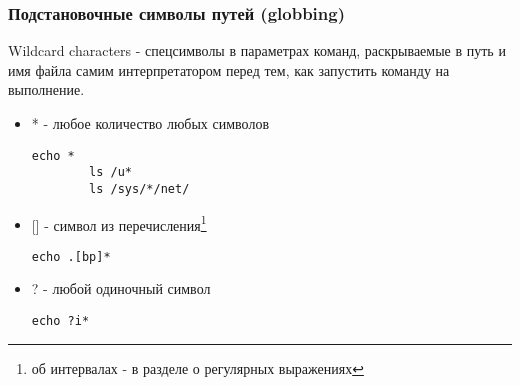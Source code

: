 \begin{frame}[fragile]
  \frametitle{Подстановочные символы путей (globbing)}

  \alert{Wildcard characters} - спецсимволы в параметрах команд, раскрываемые в путь и имя файла самим интерпретатором перед тем, как запустить команду на выполнение. \pause


  \begin{itemize}
    \item \alert{*} - любое количество любых символов
\begin{lstlisting}[basicstyle=\normalsize]
        echo *
        ls /u*
        ls /sys/*/net/
\end{lstlisting} \pause
    \item \alert{[]} - символ из перечисления\footnote{об интервалах - в разделе о регулярных выражениях}
\begin{lstlisting}[basicstyle=\normalsize]
        echo .[bp]*
\end{lstlisting} \pause
    \item \alert{?} - любой одиночный символ
\begin{lstlisting}[basicstyle=\normalsize]
        echo ?i*
\end{lstlisting} 
  \end{itemize}

\end{frame}

